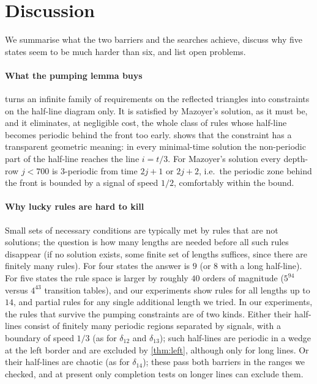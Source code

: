 \section{Discussion}\label{sec:discussion}

We summarise what the two barriers and the searches achieve, discuss why
five states seem to be much harder than six, and list open problems.

\paragraph{What the pumping lemma buys}
 turns an infinite family of requirements on the
reflected triangles into constraints on the half-line diagram only. It is
satisfied by Mazoyer's solution, as it must be, and it eliminates, at
negligible cost, the whole class of rules whose half-line becomes periodic
behind the front too early.  shows that the constraint has a
transparent geometric meaning: in every minimal-time solution the
non-periodic part of the half-line reaches the line $i=t/3$. For Mazoyer's
solution every depth-row $j<700$ is $3$-periodic from time $2j+1$ or $2j+2$,
i.e.\ the periodic zone behind the front is bounded by a signal of speed
$1/2$, comfortably within the bound.

\paragraph{Why lucky rules are hard to kill}
Small sets of necessary conditions are typically met by rules that are not
solutions; the question is how many lengths are needed before all such rules
disappear (if no solution exists, some finite set of lengths suffices, since
there are finitely many rules). For four states the answer is $9$ (or $8$ with a long
half-line). For five states the rule space is larger by roughly $40$
orders of magnitude ($5^{94}$ versus $4^{43}$ transition tables), and our
experiments show rules for all lengths up to $14$, and partial rules for
any single additional length we tried. In our experiments, the rules that
survive the pumping constraints are of two kinds. Either their half-lines
consist of finitely many periodic regions separated by signals, with a
boundary of speed $1/3$ (as for $\delta_{12}$ and $\delta_{13}$); such
half-lines are periodic in a wedge at the left border and are excluded by
\cref{thm:left}, although only for long lines. Or their half-lines are
chaotic (as for $\delta_{14}$); these pass both barriers in the ranges we
checked, and at present only completion tests on longer lines can exclude
them.

